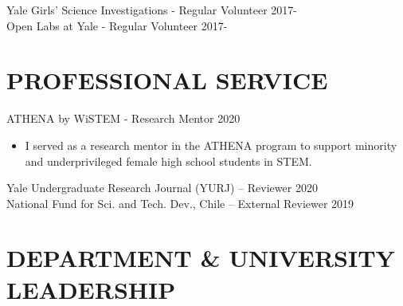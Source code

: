 \documentclass[margin]{res}
\begin{document}
\begin{resume}
Yale Girls' Science Investigations - Regular Volunteer \hfill 2017- \\
Open Labs at Yale - Regular Volunteer \hfill 2017- 

\section{\normalfont PROFESSIONAL SERVICE}
ATHENA by WiSTEM - Research Mentor \hfill 2020 %
\begin{itemize}
    \item I served as a research mentor in the ATHENA program to support minority and underprivileged female high school students in STEM.
\end{itemize}
\vspace{-3mm} 

Yale Undergraduate Research Journal (YURJ) -- Reviewer \hfill 2020 \\

\vspace{-7mm}
National Fund for Sci. and Tech. Dev., Chile -- External Reviewer \hfill 2019 %


\section{\normalfont DEPARTMENT \& UNIVERSITY LEADERSHIP}


\end{resume}
\end{document}
